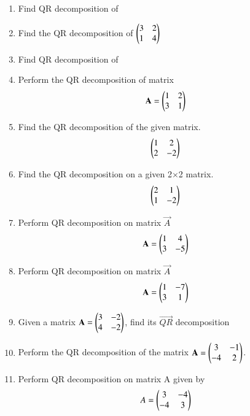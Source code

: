 \begin{enumerate}[label=\thesection.\arabic*.,ref=\thesection.\theenumi]
\item Find QR decomposition of 
\\
\solution

\item Find the QR decomposition of $\begin{pmatrix}3&2\\1&4\end{pmatrix}$ 
\\
\solution

%
\item Find QR decomposition of 
\\
\solution

%
\item Perform the QR decomposition of matrix 
\begin{align}
 \mathbf{A}=\begin{pmatrix}1&2\\3&1\end{pmatrix}
\end{align}
\solution

\item Find the QR decomposition of the given matrix.
\begin{align}
    \begin{pmatrix}1&2\\2&-2\end{pmatrix}
\end{align}
\solution

%
\item Find the QR decomposition  on a given 2$\times$2 matrix. 
\begin{align}
    \begin{pmatrix}2&1\\1&-2\end{pmatrix}
\end{align}
%
\solution

\item Perform QR decomposition on matrix $\vec{A}$
\begin{align}
    \mathbf{A}=\begin{pmatrix} 1 & 4 \\ 3 & -5 \end{pmatrix}\label{eq:solutions/2/21/givmat}
\end{align}
\solution

%
\item  Perform QR decomposition on matrix $\vec{A}$
\begin{align}
    \mathbf{A}=\begin{pmatrix} 1 & -7 \\ 3 & 1 \end{pmatrix}\label{eq:solutions/2/22/givmat}
\end{align}
\solution

%
\item Given a matrix $\mathbf{A} = \begin{pmatrix}3 & -2\\4 & -2\end{pmatrix}$, find its $\vec{QR}$ decomposition
%
\solution

\item Perform the QR decomposition of the matrix $\mathbf{A}=\begin{pmatrix}3&-1\\-4&2\end{pmatrix}$.
\solution

\item Perform QR decomposition on matrix A given by
\begin{align*}
	A = \begin{pmatrix}3 & -4 \\ -4 & 3\end{pmatrix} 
\end{align*}


\end{enumerate}
